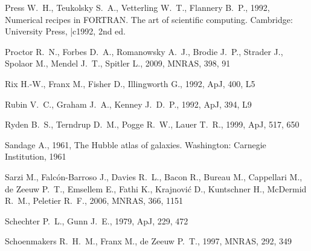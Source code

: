 \documentclass[usenatbib,usegraphicx]{mn2e}
\def\apj{ApJ}           %
\def\apjl{ApJ}          %
\def\mnras{MNRAS}       %
\begin{document}
\begin{thebibliography}{}
{Press} W.~H.,  {Teukolsky} S.~A.,  {Vetterling} W.~T.,    {Flannery} B.~P.,
  1992, {Numerical recipes in FORTRAN. The art of scientific computing}.
Cambridge: University Press, |c1992, 2nd ed.

{Proctor} R.~N.,  {Forbes} D.~A.,  {Romanowsky} A.~J.,  {Brodie} J.~P.,
  {Strader} J.,  {Spolaor} M.,  {Mendel} J.~T.,    {Spitler} L.,  2009, \mnras,
  398, 91

{Rix} H.-W.,  {Franx} M.,  {Fisher} D.,    {Illingworth} G.,  1992, \apjl, 400,
  L5

{Rubin} V.~C.,  {Graham} J.~A.,    {Kenney} J.~D.~P.,  1992, \apjl, 394, L9

{Ryden} B.~S.,  {Terndrup} D.~M.,  {Pogge} R.~W.,    {Lauer} T.~R.,  1999,
  \apj, 517, 650

{Sandage} A.,  1961, {The Hubble atlas of galaxies}.
Washington: Carnegie Institution, 1961

{Sarzi} M.,  {Falc{\'o}n-Barroso} J.,  {Davies} R.~L.,  {Bacon} R.,  {Bureau}
  M.,  {Cappellari} M.,  {de Zeeuw} P.~T.,  {Emsellem} E.,  {Fathi} K.,
  {Krajnovi{\'c}} D.,  {Kuntschner} H.,  {McDermid} R.~M.,    {Peletier} R.~F.,
   2006, \mnras, 366, 1151

{Schechter} P.~L.,  {Gunn} J.~E.,  1979, \apj, 229, 472

{Schoenmakers} R.~H.~M.,  {Franx} M.,    {de Zeeuw} P.~T.,  1997, \mnras, 292,
  349


\end{thebibliography}
\end{document}
